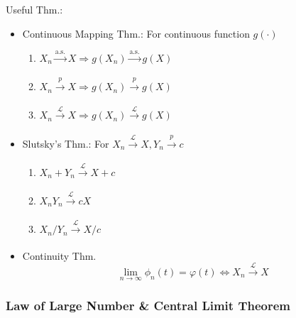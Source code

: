         Useful Thm.:
        \begin{itemize}
            \item Continuous Mapping Thm.: For continuous function $g(\cdot)$
            \begin{enumerate}
                \item $X_n\xrightarrow[]{\text{a.s.}}X\Rightarrow g(X_n)\xrightarrow[]{\text{a.s.}}g(X)$
                \item $X_n\xrightarrow[]{p}X\Rightarrow g(X_n)\xrightarrow[]{p}g(X)$
                \item $X_n\xrightarrow[]{\mathscr{L}}X\Rightarrow g(X_n)\xrightarrow[]{\mathscr{L}}g(X)$
            \end{enumerate}
            \item Slutsky's Thm.: For $X_n\xrightarrow[]{\mathscr{L}}X,Y_n\xrightarrow[]{p}c$
            \begin{enumerate}
                \item $X_n+Y_n\xrightarrow[]{\mathscr{L}}X+c$
                \item $X_nY_n\xrightarrow[]{\mathscr{L}}cX$
                \item $X_n/Y_n\xrightarrow[]{\mathscr{L}}X/c$
            \end{enumerate}
            \item Continuity Thm.
            \begin{equation}        \lim_{n\to\infty}\phi_n(t)=\varphi(t)\Leftrightarrow X_n\xrightarrow[]{\mathscr{L}}X\end{equation}
        \end{itemize} 


\subsubsection{Law of Large Number \& Central Limit Theorem}

